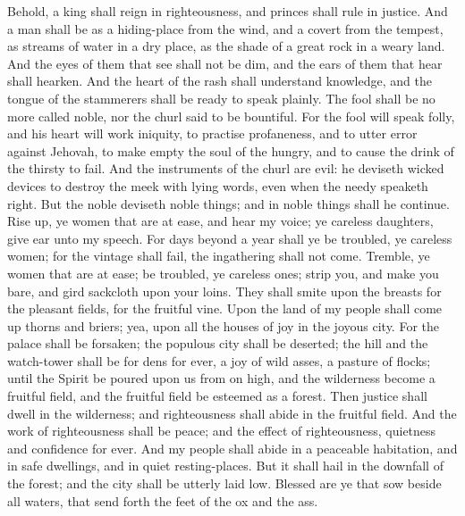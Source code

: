 Behold, a king shall reign in righteousness, and princes shall rule in justice. And a man shall be as a hiding-place from the wind, and a covert from the tempest, as streams of water in a dry place, as the shade of a great rock in a weary land. And the eyes of them that see shall not be dim, and the ears of them that hear shall hearken. And the heart of the rash shall understand knowledge, and the tongue of the stammerers shall be ready to speak plainly. The fool shall be no more called noble, nor the churl said to be bountiful. For the fool will speak folly, and his heart will work iniquity, to practise profaneness, and to utter error against Jehovah, to make empty the soul of the hungry, and to cause the drink of the thirsty to fail. And the instruments of the churl are evil: he deviseth wicked devices to destroy the meek with lying words, even when the needy speaketh right. But the noble deviseth noble things; and in noble things shall he continue.  Rise up, ye women that are at ease, and hear my voice; ye careless daughters, give ear unto my speech. For days beyond a year shall ye be troubled, ye careless women; for the vintage shall fail, the ingathering shall not come. Tremble, ye women that are at ease; be troubled, ye careless ones; strip you, and make you bare, and gird sackcloth upon your loins. They shall smite upon the breasts for the pleasant fields, for the fruitful vine. Upon the land of my people shall come up thorns and briers; yea, upon all the houses of joy in the joyous city. For the palace shall be forsaken; the populous city shall be deserted; the hill and the watch-tower shall be for dens for ever, a joy of wild asses, a pasture of flocks; until the Spirit be poured upon us from on high, and the wilderness become a fruitful field, and the fruitful field be esteemed as a forest.  Then justice shall dwell in the wilderness; and righteousness shall abide in the fruitful field. And the work of righteousness shall be peace; and the effect of righteousness, quietness and confidence for ever. And my people shall abide in a peaceable habitation, and in safe dwellings, and in quiet resting-places. But it shall hail in the downfall of the forest; and the city shall be utterly laid low. Blessed are ye that sow beside all waters, that send forth the feet of the ox and the ass. 

